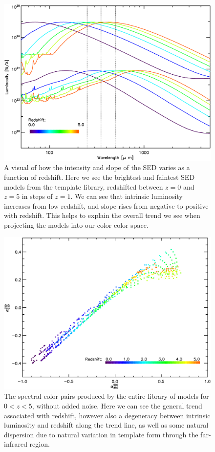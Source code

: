 \documentclass[twocolumn,letterpaper,10pt]{article}
\begin{document}
\begin{figure}
\includegraphics[width=\textwidth]{model_brightness.eps}
\caption{A visual of how the intensity and slope of the SED varies as a function of redshift. Here we see the brightest and faintest SED models from the \citet{rieke09} template library, redshifted between $z=0$ and $z=5$ in steps of $z=1$. We can see that intrinsic luminosity increases from low redshift, and slope rises from negative to positive with redshift. This helps to explain the overall trend we see when projecting the models into our color-color space.}
\label{mshift}
\end{figure}

\begin{figure}
  \includegraphics[width=\textwidth]{model_colors.eps}
  \caption{The spectral color pairs produced by the entire library of models for $0<z<5$, without added noise. Here we can see the general trend associated with redshift, however also a degeneracy between intrinsic luminosity and redshift along the trend line, as well as some natural dispersion due to natural variation in template form through the far-infrared region.}
  \label{slib_color}
\end{figure}
\end{document}
